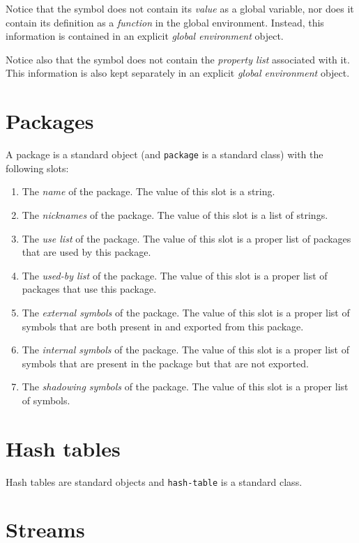Notice that the symbol does not contain its \emph{value} as a global
variable, nor does it contain its definition as a \emph{function} in
the global environment.  Instead, this information is contained in an
explicit \emph{global environment} object.

Notice also that the symbol does not contain the \emph{property list}
associated with it.  This information is also kept separately in an
explicit \emph{global environment} object.

\section{Packages}

A package is a standard object (and \texttt{package} is a standard
class) with the following slots:

\begin{enumerate}
\item The \emph{name} of the package.  The value of this slot is a
  string.
\item The \emph{nicknames} of the package.  The value of this slot is
  a list of strings.
\item The \emph{use list} of the package.  The value of this slot is a
  proper list of packages that are used by this package.
\item The \emph{used-by list} of the package.  The value of this slot
is a proper list of packages that use this package.
\item The \emph{external symbols} of the package.  The value of this
  slot is a proper list of symbols that are both present in and
  exported from this package.
\item The \emph{internal symbols} of the package.  The value of this
  slot is a proper list of symbols that are present in the package but
  that are not exported.
\item The \emph{shadowing symbols} of the package.  The value of this
  slot is a proper list of symbols.
\end{enumerate}

\section{Hash tables}

Hash tables are standard objects and \texttt{hash-table} is a standard
class. 

\section{Streams}

